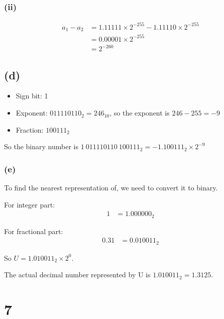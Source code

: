 \documentclass[12pt]{article}
\begin{document}
\subsubsection*{(ii)}

\begin{align*}
a_1 - a_2 &= 1.11111 \times 2^{-255} - 1.11110 \times 2^{-255} \\
&= 0.00001 \times 2^{-255} \\
&= 2^{-260}
\end{align*}

\subsection*{(d)}

\begin{itemize}
    \item Sign bit: 1
    \item Exponent: $011110110_2 = 246_{10}$, so the exponent is $246 - 255 = -9$
    \item Fraction: $100111_2$
\end{itemize}

So the binary number is $1\ 011110110\ 100111_2 = -1.100111_2 \times 2^{-9}$

\subsubsection*{(e)}

To find the nearest representation of, we need to convert it to binary.

For integer part:
\begin{align*}
1 &= 1.000000_2
\end{align*}

For fractional part:
\begin{align*}
0.31 &= 0.010011_2
\end{align*}

So $U = 1.010011_2 \times 2^0$.

The actual decimal number represented by U is $1.010011_2 = 1.3125$.

\section*{7}

\end{document}
